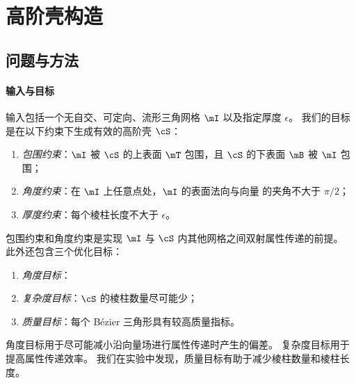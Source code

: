 ﻿\section{高阶壳构造} \label{sec:construction}
\subsection{问题与方法}
\paragraph{输入与目标}
输入包括一个无自交、可定向、流形三角网格 $\mI$ 以及指定厚度 $\epsilon$。
我们的目标是在以下约束下生成有效的高阶壳 $\cS$：
\begin{enumerate}
  \item \emph{包围约束}：$\mI$ 被 $\cS$ 的上表面 $\mT$ 包围，且 $\cS$ 的下表面 $\mB$ 被 $\mI$ 包围；
  \item \emph{角度约束}：在 $\mI$ 上任意点处，$\mI$ 的表面法向与向量 \tr{$\cF$} 的夹角不大于 $\pi/2$；
  \item \emph{厚度约束}：每个棱柱长度不大于 $\epsilon$。
\end{enumerate}
包围约束和角度约束是实现 $\mI$ 与 $\cS$ 内其他网格之间双射属性传递的前提。
%
此外还包含三个优化目标：
\begin{enumerate}
  \item \emph{角度目标}：
  \item \emph{复杂度目标}：$\cS$ 的棱柱数量尽可能少；
  \item \emph{质量目标}：每个 B\'{e}zier 三角形具有较高质量指标。
\end{enumerate}
角度目标用于尽可能减小沿向量场进行属性传递时产生的偏差。
复杂度目标用于提高属性传递效率。
我们在实验中发现，质量目标有助于减少棱柱数量和棱柱长度。



